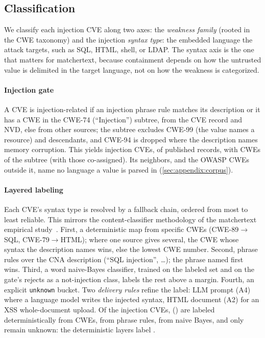 \subsection{Classification}
\label{sec:classify}

We classify each injection CVE along two axes: the \emph{weakness family}
(rooted in the CWE taxonomy) and the injection \emph{syntax type}: the
embedded language the attack targets, such as SQL, HTML, shell, or LDAP.
The syntax axis is the one that matters for matchertext, because containment
depends on how the untrusted value is delimited in the target language, not on
how the weakness is categorized.

\paragraph{Injection gate}
A CVE is injection-related if an injection phrase rule matches its description
or it has a CWE in the \mbox{CWE-74} (``Injection'') subtree, from the CVE record
and NVD, else from other sources; the subtree excludes \mbox{CWE-99} (the value
names a resource) and descendants, and \mbox{CWE-94} is dropped where the description names memory
corruption.
This yields \textbf{\dataInjectionCVEs} injection CVEs, \textbf{\dataInjectionSharePrecise} of published
records, with \dataInjectionSubtreeCWEs CWEs of the subtree (\dataInjectionCWEs with
those co-assigned).
Its neighbors, and the OWASP CWEs outside it, name no language a value is
parsed in (\cref{sec:appendix:corpus}).

\paragraph{Layered labeling}
Each CVE's syntax type is resolved by a fallback chain, ordered from most to
least reliable.
This mirrors the content-classifier methodology of the matchertext empirical
study~\cite{matchertext}.
First, a deterministic map from specific CWEs (\eg \mbox{CWE-89}$\rightarrow$SQL,
\mbox{CWE-79}$\rightarrow$HTML); where one source gives several, the CWE whose
syntax the description names wins, else the lowest CWE number.
Second, phrase rules over the CNA description (``SQL injection'', \dots); the
phrase named first wins.
Third, a word naive-Bayes classifier, trained on the labeled set and on the
gate's rejects as a not-injection class, labels the rest above a margin.
Fourth, an explicit \texttt{unknown} bucket.
Two \emph{delivery rules} refine the label: LLM prompt (A4) where a language
model writes the injected syntax, HTML document (A2) for an XSS whole-document
upload.
Of the injection CVEs, \dataMethodCwe (\dataMethodCweShare) are labeled deterministically from CWEs,
\dataMethodRule from phrase rules, \dataMethodNb from naive Bayes, and only \dataMethodUnknown remain
unknown: the deterministic layers label \dataMethodDeterministicShare.

